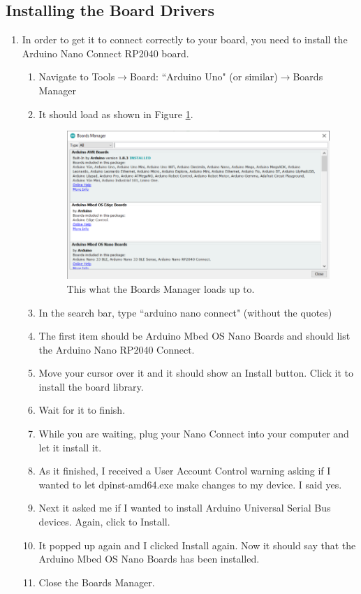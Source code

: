 \subsection{Installing the Board Drivers}
\begin{enumerate}
	\item In order to get it to connect correctly to your board, you need to install the Arduino Nano Connect RP2040 board.
	\begin{enumerate}
		\item Navigate to Tools$\rightarrow$Board: ``Arduino Uno" (or similar)$\rightarrow$Boards Manager
		\item It should load as shown in Figure \ref{fig:boardsManager}.
        \begin{figure}[!htb]
            \centering
            \includegraphics[scale=0.9]{arduinoStart/BoardsManager.PNG}
            \caption{This what the Boards Manager loads up to.}
            \label{fig:boardsManager}
        \end{figure} 
        \item In the search bar, type ``arduino nano connect" (without the quotes)
		\item The first item should be Arduino Mbed OS Nano Boards and should list the Arduino Nano RP2040 Connect.
		\item Move your cursor over it and it should show an Install button. Click it to install the board library.
		\item Wait for it to finish.
		\item While you are waiting, plug your Nano Connect into your computer and let it install it.
		\item As it finished, I received a User Account Control warning asking if I wanted to let dpinst-amd64.exe make changes to my device. I said yes.
		\item Next it asked me if I wanted to install Arduino Universal Serial Bus devices. Again, click to Install.
		\item It popped up again and I clicked Install again. Now it should say that the Arduino Mbed OS Nano Boards has been installed.
		\item Close the Boards Manager.
	\end{enumerate}
\end{enumerate}


